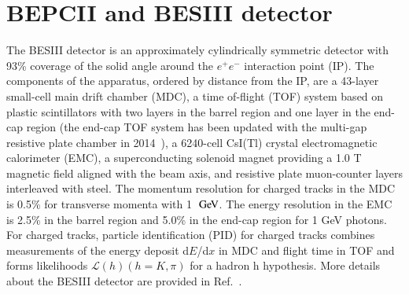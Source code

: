 \clearpage
\section{BEPCII and BESIII detector}
\label{sec:detector}

The BESIII detector is an approximately cylindrically symmetric detector with 93\% coverage of the solid angle around the $e^+e^-$ interaction point (IP). The components of the apparatus, ordered by distance from the IP, are a 43-layer small-cell main drift chamber (MDC), a time of-flight (TOF) system based on plastic scintillators with two layers in the barrel region and one layer in the end-cap region (the end-cap TOF system has been updated with the multi-gap resistive plate chamber in 2014~\cite{Yang:2014pfa}), a 6240-cell CsI(Tl) crystal electromagnetic calorimeter (EMC), a superconducting solenoid magnet providing a 1.0 T magnetic field aligned with the beam axis, and resistive plate muon-counter layers interleaved with steel. The momentum resolution for charged tracks in the MDC is 0.5\% for transverse momenta with 1 $\gev$. The energy resolution in the EMC is 2.5\% in the barrel region and 5.0\% in the end-cap region for  1 GeV photons. For charged tracks, particle identification (PID) for charged tracks combines measurements of the energy deposit d$E$/d$x$ in MDC and flight time in TOF and forms likelihoods $\mathcal{L}(h)(h = K, \pi)$ for a hadron h hypothesis. More details about the BESIII detector are provided in Ref.~\cite{BESIII:2009fln}.
